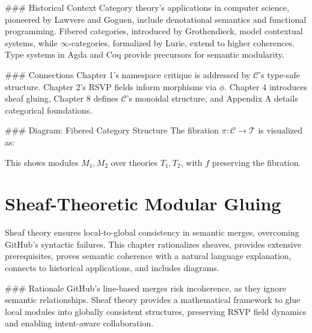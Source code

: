 \documentclass[12pt]{article}
\begin{document}
{### Historical Context
Category theory’s applications in computer science, pioneered by Lawvere and Goguen, include denotational semantics and functional programming. Fibered categories, introduced by Grothendieck, model contextual systems, while $\infty$-categories, formalized by Lurie, extend to higher coherences. Type systems in Agda and Coq provide precursors for semantic modularity.

### Connections
Chapter 1’s namespace critique is addressed by $\mathcal{C}$’s type-safe structure. Chapter 2’s RSVP fields inform morphisms via $\phi$. Chapter 4 introduces sheaf gluing, Chapter 8 defines $\mathcal{C}$’s monoidal structure, and Appendix A details categorical foundations.

### Diagram: Fibered Category Structure
The fibration $\pi : \mathcal{C} \to \mathcal{T}$ is visualized as:

\begin{center}
\end{center}

This shows modules $M_1, M_2$ over theories $T_1, T_2$, with $f$ preserving the fibration.

\section{Sheaf-Theoretic Modular Gluing}
\label{sec:chapter4}

Sheaf theory ensures local-to-global consistency in semantic merges, overcoming GitHub’s syntactic failures. This chapter rationalizes sheaves, provides extensive prerequisites, proves semantic coherence with a natural language explanation, connects to historical applications, and includes diagrams.

### Rationale
GitHub’s line-based merges risk incoherence, as they ignore semantic relationships. Sheaf theory provides a mathematical framework to glue local modules into globally consistent structures, preserving RSVP field dynamics and enabling intent-aware collaboration.

}
\end{document}
